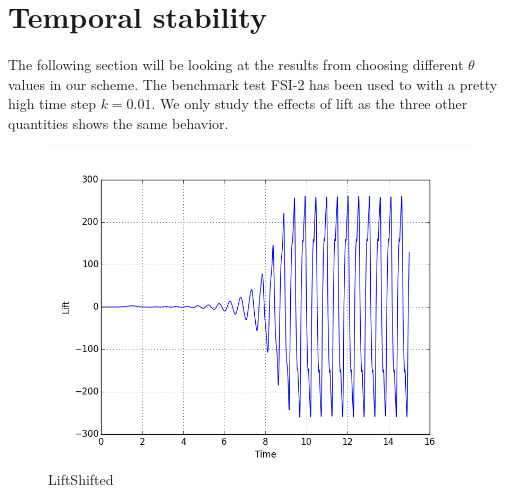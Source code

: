 \section{Temporal stability}
The following section will be looking at the results from choosing different $\theta$ values in our scheme. The benchmark test FSI-2 has been used to with a pretty high time step $ k = 0.01$. We only study the effects of lift as the three other quantities shows the same behavior.   
\begin{figure}[H]
\label{fig:lift_shifted}
\caption{LiftShifted}
\includegraphics[scale=0.6, trim={0mm 0mm 0mm 0mm},clip]{./Verification_Validation/Temporal_stability/lift_shifted.png}
\end{figure}


